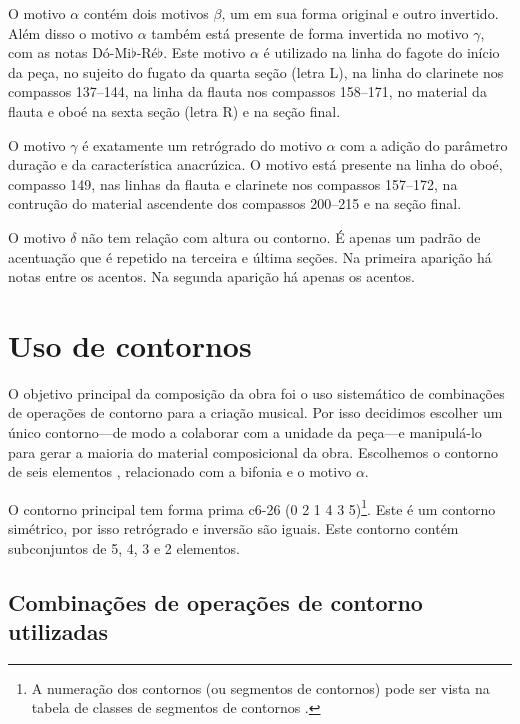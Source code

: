 O motivo $\alpha$ contém dois motivos $\beta$, um em sua forma
original e outro invertido. Além disso o motivo $\alpha$ também está
presente de forma invertida no motivo $\gamma$, com as notas
Dó-Mi$\flat$-Ré$\flat$. Este motivo $\alpha$ é utilizado na linha do
fagote do início da peça, no sujeito do fugato da quarta seção (letra
L), na linha do clarinete nos compassos 137--144, na linha da flauta
nos compassos 158--171, no material da flauta e oboé na sexta seção
(letra R) e na seção final.

O motivo $\gamma$ é exatamente um retrógrado do motivo $\alpha$ com a
adição do parâmetro duração e da característica anacrúzica. O motivo
está presente na linha do oboé, compasso 149, nas linhas da flauta e
clarinete nos compassos 157--172, na contrução do material ascendente
dos compassos 200--215 e na seção final.

O motivo $\delta$ não tem relação com altura ou contorno. É apenas um
padrão de acentuação que é repetido na terceira e última seções. Na
primeira aparição há notas  entre os acentos. Na segunda
aparição há apenas os acentos.

\section{Uso de contornos}
\label{sec:uso-de-contornos}

O objetivo principal da composição da obra \obra{} foi o uso
sistemático de combinações de operações de contorno para a criação
musical. Por isso decidimos escolher um único contorno---de modo a
colaborar com a unidade da peça---e manipulá-lo para gerar a maioria
do material composicional da obra. Escolhemos o contorno de seis
elementos \contpr{}, relacionado com a bifonia e o motivo $\alpha$.

O contorno principal \contpr{} tem forma prima c6-26 (0 2 1 4 3
5)\footnote{A numeração dos contornos (ou segmentos de contornos) pode
  ser vista na tabela de classes de segmentos de contornos
  \cite{marvin.ea87:relating}.}. Este é um contorno simétrico, por
isso retrógrado e inversão são iguais. Este contorno contém
subconjuntos de 5, 4, 3 e 2 elementos.

\subsection{Combinações de operações de contorno utilizadas}
\label{sec:comb-de-oper}

